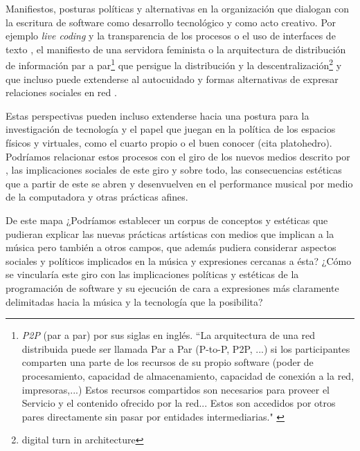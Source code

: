 Manifiestos, posturas políticas y alternativas en la organización que dialogan con la escritura de software como desarrollo tecnológico y como acto creativo. Por ejemplo \textit{live coding} y la transparencia de los procesos o el uso de interfaces de texto \citep{collinsLivecoding}, el manifiesto de una servidora feminista \citep{feministserver} o la arquitectura de distribución de información par a par\footnote{\textit{P2P} (par a par) por sus siglas en inglés.  ``La arquitectura de una red distribuida puede ser llamada Par a Par (P-to-P, P2P, ...)   si los participantes comparten una parte de los recursos de su propio software (poder de procesamiento, capacidad de almacenamiento, capacidad de conexión a la red, impresoras,...) Estos recursos compartidos son necesarios para proveer el Servicio y el contenido ofrecido por la red... Estos son accedidos por otros pares directamente sin pasar por entidades intermediarias." \citep{p2p}} que persigue la distribución y la descentralización\footnote{digital turn in architecture} y que incluso puede extenderse al autocuidado y formas alternativas de expresar relaciones sociales en red \citep{dwc}. 

Estas perspectivas pueden incluso extenderse hacia una postura para la investigación de tecnología y el papel que juegan en la política de los espacios físicos y virtuales, como el cuarto propio \citep{cuartopropio} o el buen conocer (cita platohedro). Podríamos relacionar estos procesos con el giro de los nuevos medios descrito por \cite{manovichlanguage}, las implicaciones sociales de este giro y sobre todo, las consecuencias estéticas que a partir de este se abren y desenvuelven en el performance musical por medio de la computadora y otras prácticas afines. 

De este mapa ¿Podríamos establecer un corpus de conceptos y estéticas \citep{shankenCanon} que pudieran explicar las nuevas prácticas artísticas con medios que implican a la música pero también a otros campos, que además pudiera considerar aspectos sociales y políticos implicados en la música y expresiones cercanas a ésta? ¿Cómo se vincularía este giro con las implicaciones políticas y estéticas de la programación de software y su ejecución \citep{speakingCode} de cara a expresiones más claramente delimitadas hacia la música y la tecnología que la posibilita?

\iffalse

- manifiestos y posturas políticas > live coding y servidora feminista 
- Diferencias con respecto a otros espacios
- Discusión sobre lo digital, los nuevos medios y la virtualidad. 
- Giro de los nuevos medios
- Agotamiento del formato
- funcionalidad - experimentación 
- Arqueología en internet (cosas que ya tienen tiempo y cosas recientes). 
- El papel de los videojuegos gamización
- Lo barroco y el artículo de electroacústica. 
- Espacio, arquitectura e integración: puede el espacio virtual convertirse en un objeto con agencia en la interpretacion en vivo? 

\fi
